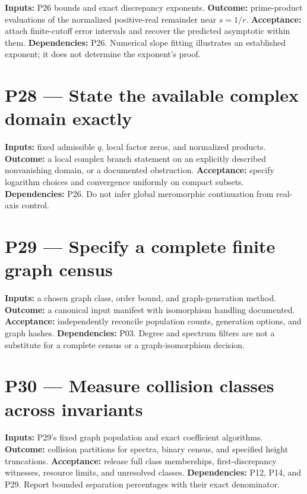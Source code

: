 \documentclass[
  11pt,
  a4paper,
]{report}
\begin{document}
\textbf{Inputs:} P26 bounds and exact discrepancy exponents.
\textbf{Outcome:} prime-product evaluations of the normalized
positive-real remainder near \(s=1/r\). \textbf{Acceptance:} attach
finite-cutoff error intervals and recover the predicted asymptotic
within them. \textbf{Dependencies:} P26. Numerical slope fitting
illustrates an established exponent; it does not determine the
exponent's proof.

\hypertarget{p28-state-the-available-complex-domain-exactly}{%
\section{P28 --- State the available complex domain
exactly}\label{p28-state-the-available-complex-domain-exactly}}

\textbf{Inputs:} fixed admissible \(q\), local factor zeros, and
normalized products. \textbf{Outcome:} a local complex branch statement
on an explicitly described nonvanishing domain, or a documented
obstruction. \textbf{Acceptance:} specify logarithm choices and
convergence uniformly on compact subsets. \textbf{Dependencies:} P26. Do
not infer global meromorphic continuation from real-axis control.

\hypertarget{p29-specify-a-complete-finite-graph-census}{%
\section{P29 --- Specify a complete finite graph
census}\label{p29-specify-a-complete-finite-graph-census}}

\textbf{Inputs:} a chosen graph class, order bound, and graph-generation
method. \textbf{Outcome:} a canonical input manifest with isomorphism
handling documented. \textbf{Acceptance:} independently reconcile
population counts, generation options, and graph hashes.
\textbf{Dependencies:} P03. Degree and spectrum filters are not a
substitute for a complete census or a graph-isomorphism decision.

\hypertarget{p30-measure-collision-classes-across-invariants}{%
\section{P30 --- Measure collision classes across
invariants}\label{p30-measure-collision-classes-across-invariants}}

\textbf{Inputs:} P29's fixed graph population and exact coefficient
algorithms. \textbf{Outcome:} collision partitions for spectra, binary
census, and specified height truncations. \textbf{Acceptance:} release
full class memberships, first-discrepancy witnesses, resource limits,
and unresolved classes. \textbf{Dependencies:} P12, P14, and P29. Report
bounded separation percentages with their exact denominator.
\end{document}
